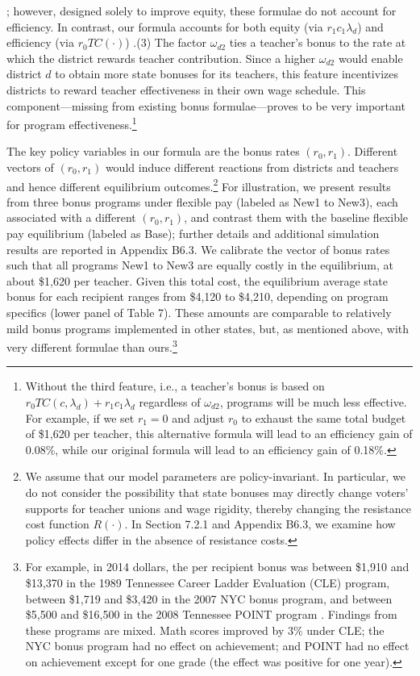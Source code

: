 \documentclass[notitlepage,12pt]{article}%
\begin{document}
\citep{bobba2021teacher,swain2019selective}; however, designed solely to
improve equity, these formulae do not account for efficiency. In contrast, our
formula accounts for both equity (via $r_{1}c_{1}\lambda_{d}$) and efficiency
(via $r_{0}TC\left(  \cdot\right)  $) .\newline(3) The factor $\omega_{d2}$
ties a teacher's bonus to the rate at which the district rewards teacher
contribution. Since a higher $\omega_{d2}$ would enable district $d$ to obtain
more state bonuses for its teachers, this feature incentivizes districts to
reward teacher effectiveness in their own wage schedule. This
component---missing from existing bonus formulae---proves to be very important
for program effectiveness.\footnote{Without the third feature, i.e., a
teacher's bonus is based on $r_{0}TC\left(  c,\lambda_{d}\right)  +r_{1}%
c_{1}\lambda_{d}$ regardless of $\omega_{d2}$, programs will be much less
effective. For example, if we set $r_{1}=0$ and adjust $r_{0}$ to exhaust the
same total budget of \$1,620 per teacher, this alternative formula will lead
to an efficiency gain of 0.08\%, while our original formula will lead to an
efficiency gain of 0.18\%.}

The key policy variables in our formula are the bonus rates $\left(
r_{0},r_{1}\right)  .$ Different vectors of $(r_{0},r_{1})$ would induce
different reactions from districts and teachers and hence different
equilibrium outcomes.\footnote{We assume that our model parameters are
policy-invariant. In particular, we do not consider the possibility that state
bonuses may directly change voters' supports for teacher unions and wage
rigidity, thereby changing the resistance cost function $R\left(
\cdot\right)  $. In Section 7.2.1 and Appendix B6.3, we examine how
policy effects differ in the absence of resistance costs.} For illustration,
we present results from three bonus programs under flexible pay (labeled as
New1 to New3), each associated with a different $(r_{0},r_{1})$, and contrast
them with the baseline flexible pay equilibrium (labeled as Base); further
details and additional simulation results are reported in Appendix
B6.3. We calibrate the vector of bonus rates such that all programs New1 to
New3 are equally costly in the equilibrium, at about \$1,620 per teacher.
Given this total cost, the equilibrium average state bonus for each recipient
ranges from \$4,120 to \$4,210, depending on program specifics (lower panel of
Table 7). These amounts are comparable to relatively mild bonus programs
implemented in other states, but, as mentioned above, with very different
formulae than ours.\footnote{For example, in 2014 dollars, the per recipient
bonus was between \$1,910 and \$13,370 in the 1989 Tennessee Career Ladder
Evaluation (CLE) program, between \$1,719 and \$3,420 in the 2007 NYC bonus
program, and between \$5,500 and \$16,500 in the 2008 Tennessee POINT program
\citep{neal2011design}. Findings from these programs are mixed. Math scores
improved by 3\% under CLE; the NYC bonus program had no effect on achievement;
and POINT had no effect on achievement except for one grade (the effect was
positive for one year).}
\end{document}
